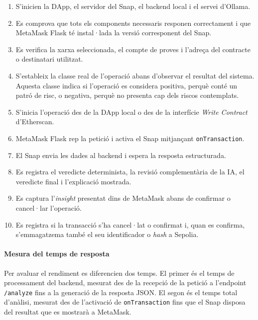 \begin{enumerate}
    \item S'inicien la DApp, el servidor del Snap, el backend local i el servei d'Ollama.
    
    \item Es comprova que tots els components necessaris responen correctament i que MetaMask Flask té instal·lada la versió corresponent del Snap.
    
    \item Es verifica la xarxa seleccionada, el compte de proves i l'adreça del contracte o destinatari utilitzat.
    
    \item S'estableix la classe real de l'operació abans d'observar el resultat del sistema. Aquesta classe indica si l'operació es considera positiva, perquè conté un patró de risc, o negativa, perquè no presenta cap dels riscos contemplats.
    
    \item S'inicia l'operació des de la DApp local o des de la interfície \textit{Write Contract} d'Etherscan.
    
    \item MetaMask Flask rep la petició i activa el Snap mitjançant \texttt{onTransaction}.
    
    \item El Snap envia les dades al backend i espera la resposta estructurada.
    
    \item Es registra el veredicte determinista, la revisió complementària de la IA, el veredicte final i l'explicació mostrada.
    
    \item Es captura l'\textit{insight} presentat dins de MetaMask abans de confirmar o cancel·lar l'operació.
    
    \item Es registra si la transacció s'ha cancel·lat o confirmat i, quan es confirma, s'emmagatzema també el seu identificador o \textit{hash} a Sepolia.
\end{enumerate}

\paragraph{Mesura del temps de resposta}

Per avaluar el rendiment es diferencien dos temps. El primer és el temps de processament del backend, mesurat des de la recepció de la petició a l'endpoint \texttt{/analyze} fins a la generació de la resposta JSON. El segon és el temps total d'anàlisi, mesurat des de l'activació de \texttt{onTransaction} fins que el Snap disposa del resultat que es mostrarà a MetaMask.

